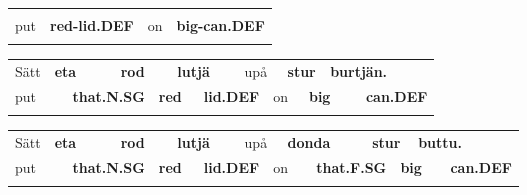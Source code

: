 \begin{tabular}{llll}
\lsptoprule
\multicolumn{4}{l}{Sätt

}\\
put & {\bfseries red-lid.DEF} & on & {\bfseries big-can.DEF}\\
\lspbottomrule
\end{tabular}

\begin{tabular}{llllllllllllll}
\lsptoprule
Sätt & \multicolumn{2}{l}{{\bfseries eta}

} & \multicolumn{2}{l}{{\bfseries rod}

} & \multicolumn{2}{l}{{\bfseries lutjä}

} & \multicolumn{2}{l}{upå

} & \multicolumn{2}{l}{{\bfseries stur}

} & \multicolumn{2}{l}{{\bfseries burtjän.}

} & \\
\multicolumn{2}{l}{put

} & \multicolumn{2}{l}{{\bfseries that.N.SG}

} & \multicolumn{2}{l}{{\bfseries red}

} & \multicolumn{2}{l}{{\bfseries lid.DEF}

} & \multicolumn{2}{l}{on

} & \multicolumn{2}{l}{{\bfseries big}

} & \multicolumn{2}{l}{{\bfseries can.DEF}

}\\
\lspbottomrule
\end{tabular}

\begin{tabular}{llllllllllllllll}
\lsptoprule
Sätt & \multicolumn{2}{l}{{\bfseries eta}

} & \multicolumn{2}{l}{{\bfseries rod}

} & \multicolumn{2}{l}{{\bfseries lutjä}

} & \multicolumn{2}{l}{upå

} & \multicolumn{2}{l}{{\bfseries donda}

} & \multicolumn{2}{l}{{\bfseries stur}

} & \multicolumn{2}{l}{{\bfseries buttu.}

} & \\
\multicolumn{2}{l}{put

} & \multicolumn{2}{l}{{\bfseries that.N.SG}

} & \multicolumn{2}{l}{{\bfseries red}

} & \multicolumn{2}{l}{{\bfseries lid.DEF}

} & \multicolumn{2}{l}{on

} & \multicolumn{2}{l}{{\bfseries that.F.SG}

} & \multicolumn{2}{l}{{\bfseries big}

} & \multicolumn{2}{l}{{\bfseries can.DEF}

}\\
\lspbottomrule
\end{tabular}

